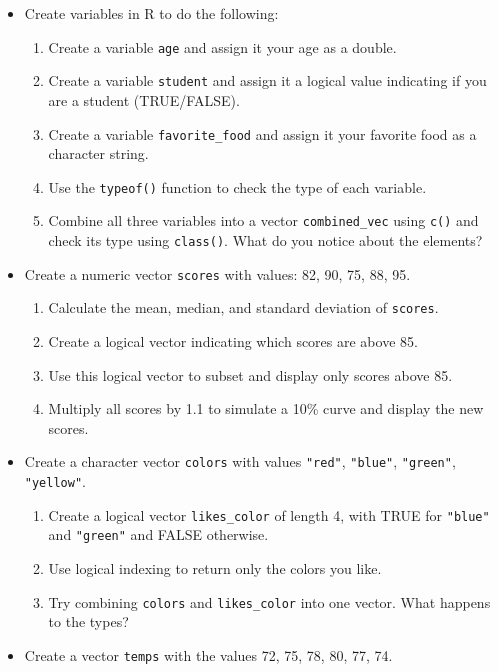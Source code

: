 \documentclass[
  letterpaper,
  DIV=11,
  numbers=noendperiod]{scrreprt}
\providecommand{\tightlist}{%
  \setlength{\itemsep}{0pt}\setlength{\parskip}{0pt}}
\begin{document}
\begin{itemize}
\tightlist
\item
  Create variables in R to do the following:

  \begin{enumerate}
  \def\labelenumi{\alph{enumi})}
  \tightlist
  \item
    Create a variable \texttt{age} and assign it your age as a double.\\
  \item
    Create a variable \texttt{student} and assign it a logical value
    indicating if you are a student (TRUE/FALSE).\\
  \item
    Create a variable \texttt{favorite\_food} and assign it your
    favorite food as a character string.\\
  \item
    Use the \texttt{typeof()} function to check the type of each
    variable.\\
  \item
    Combine all three variables into a vector \texttt{combined\_vec}
    using \texttt{c()} and check its type using \texttt{class()}. What
    do you notice about the elements?
  \end{enumerate}
\item
  Create a numeric vector \texttt{scores} with values: 82, 90, 75, 88,
  95.

  \begin{enumerate}
  \def\labelenumi{\alph{enumi})}
  \tightlist
  \item
    Calculate the mean, median, and standard deviation of
    \texttt{scores}.\\
  \item
    Create a logical vector indicating which scores are above 85.\\
  \item
    Use this logical vector to subset and display only scores above
    85.\\
  \item
    Multiply all scores by 1.1 to simulate a 10\% curve and display the
    new scores.
  \end{enumerate}
\item
  Create a character vector \texttt{colors} with values \texttt{"red"},
  \texttt{"blue"}, \texttt{"green"}, \texttt{"yellow"}.

  \begin{enumerate}
  \def\labelenumi{\alph{enumi})}
  \tightlist
  \item
    Create a logical vector \texttt{likes\_color} of length 4, with TRUE
    for \texttt{"blue"} and \texttt{"green"} and FALSE otherwise.\\
  \item
    Use logical indexing to return only the colors you like.\\
  \item
    Try combining \texttt{colors} and \texttt{likes\_color} into one
    vector. What happens to the types?
  \end{enumerate}
\item
  Create a vector \texttt{temps} with the values 72, 75, 78, 80, 77, 74.


\end{itemize}
\end{document}
